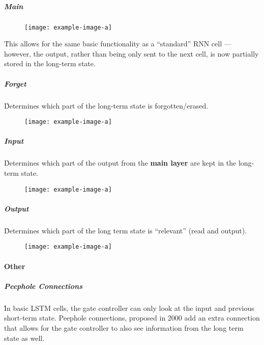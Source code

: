 \subparagraph{Main}

\begin{figure}
	\centering
	\texttt{[image: example-image-a]}\hfil
	\caption{}
\end{figure}

\r{This allows for the same basic functionality as a ``standard'' RNN cell --- however, the output, rather than being only sent to the next cell, is now partially stored in the long-term state.}


\subparagraph{Forget}

\r{Determines which part of the long-term state is forgotten/erased.}

\begin{figure}
	\centering
	\texttt{[image: example-image-a]}\hfil
	\caption{}
\end{figure}



\subparagraph{Input}

\r{Determines which part of the output from the \textbf{main layer} are kept in the long-term state.}

\begin{figure}
	\centering
	\texttt{[image: example-image-a]}\hfil
	\caption{}
\end{figure}

\subparagraph{Output}

\r{Determines which part of the long term state is ``relevant'' (read and output).}

\begin{figure}
	\centering
	\texttt{[image: example-image-a]}\hfil
	\caption{}
\end{figure}


\paragraph{Other}

\subparagraph{Peephole Connections}

\r{In basic LSTM cells, the gate controller can only look at the input and previous short-term state. Peephole connections, proposed in 2000  add an extra connection that allows for the gate controller to also see information from the long term state as well. }

